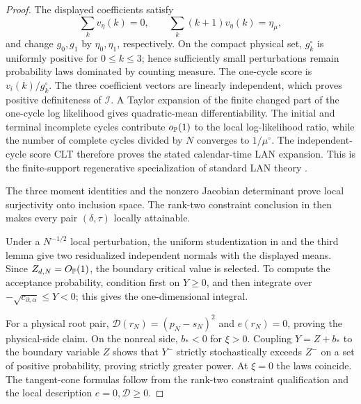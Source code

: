 \begin{proof}
The displayed coefficients satisfy
\[
\sum_kv_\eta(k)=0,\qquad
\sum_k(k+1)v_\eta(k)=\eta_\mu,
\]
and change \(g_0,g_1\) by \(\eta_0,\eta_1\), respectively.  On the compact
physical set, \(g_k^\circ\) is uniformly positive for \(0\le k\le3\);
hence sufficiently small perturbations remain probability laws dominated by
counting measure.  The one-cycle score is \(v_i(k)/g_k^\circ\).  The three
coefficient vectors are linearly independent, which proves positive
definiteness of \(\mathcal I\).  A Taylor expansion of the finite changed
part of the one-cycle log likelihood gives quadratic-mean differentiability.
The initial and terminal incomplete cycles contribute \(o_{\mathbb{P}}(1)\) to the
local log-likelihood ratio, while the number of complete cycles divided by
\(N\) converges to \(1/\mu^\circ\).  The independent-cycle score CLT
therefore proves the stated calendar-time LAN expansion.  This is the
finite-support regenerative specialization of standard LAN theory
\cite{vanDerVaart1998AsymptoticStatistics}.

The three moment identities and the nonzero Jacobian determinant prove local
surjectivity onto inclusion space.  The rank-two constraint conclusion in
 then makes every pair
\((\delta,\tau)\) locally attainable.

Under a \(N^{-1/2}\) local perturbation, the uniform studentization in
 and the third lemma give
two residualized independent normals with the displayed means.  Since
\(Z_{d,N}=O_{\mathbb{P}}(1)\), the boundary critical value is selected.  To compute
the acceptance probability, condition first on \(Y\ge0\), and then integrate
over \(-\sqrt{c_{\partial,\alpha}}\le Y<0\); this gives the one-dimensional
integral.

For a physical root pair,
\(\mathcal D(r_N)=(p_N-s_N)^2\) and \(e(r_N)=0\), proving the physical-side
claim.  On the nonreal side, \(b_*<0\) for \(\xi>0\).  Coupling
\(Y=Z+b_*\) to the boundary variable \(Z\) shows that \(Y^-\) strictly
stochastically exceeds \(Z^-\) on a set of positive probability, proving
strictly greater power.  At \(\xi=0\) the laws coincide.  The tangent-cone
formulas follow from the rank-two constraint qualification and the local
description \(e=0,\mathcal D\ge0\).
\end{proof}


